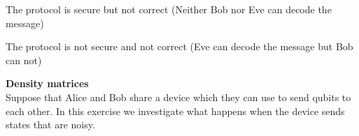 \begin{exercises}
\begin{enumerate}
\begin{statements}
\item The protocol is secure but not correct (Neither Bob nor Eve can decode the message)
\item The protocol is not secure and not correct (Eve can decode the message but Bob can not)
\end{statements}
\end{enumerate}

\item {\bf Density matrices}\\
Suppose that Alice and Bob share a device which they can use to send qubits to each other. In this exercise we  investigate what happens when the device sends states that are noisy.


\end{exercises}
